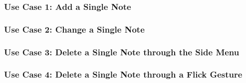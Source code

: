 


  \subsubsection{Use Case 1: Add a Single Note}


  \subsubsection{Use Case 2: Change a Single Note}


  \subsubsection{Use Case 3: Delete a Single Note through the Side Menu}


  \subsubsection{Use Case 4: Delete a Single Note through a Flick Gesture}

